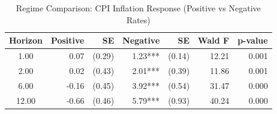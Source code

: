 \begin{table}[ht]
\centering
\caption{Regime Comparison: CPI Inflation Response (Positive vs Negative Rates)} 
\label{tab:lp_cpi_regime}
\begin{tabular}{crrrrrr}
  \toprule
Horizon & Positive & SE & Negative & SE & Wald F & p-value \\ 
  \midrule
1.00 & 0.07 & (0.29) & 1.23*** & (0.14) & 12.21 & 0.001 \\ 
  2.00 & 0.02 & (0.43) & 2.01*** & (0.39) & 11.86 & 0.001 \\ 
  6.00 & -0.16 & (0.45) & 3.92*** & (0.54) & 31.47 & 0.000 \\ 
  12.00 & -0.66 & (0.46) & 5.79*** & (0.93) & 40.24 & 0.000 \\ 
   \bottomrule
\end{tabular}
\end{table}
